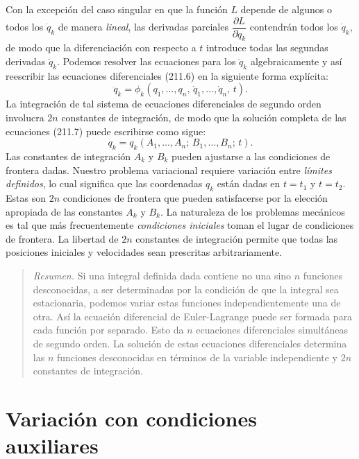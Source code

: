 \documentclass[12pt,a4paper]{book}
\begin{document}
Con la excepción del caso singular en que la función $L$ depende de algunos o todos los $\dot{q}_k$ de manera \textit{lineal}, las derivadas parciales $\dfrac{\partial L}{\partial \dot{q}_k}$ contendrán todos los $\dot{q}_k$, de modo que la diferenciación con respecto a $t$ introduce todas las segundas derivadas $\ddot{q}_k$. Podemos resolver las ecuaciones para los $\ddot{q}_k$ algebraicamente y así reescribir las ecuaciones diferenciales (211.6) en la siguiente forma explícita:
\begin{equation}
\ddot{q}_k = \phi_k(q_1, \ldots, q_n, \, \dot{q}_1, \ldots, \dot{q}_n, \, t). \tag{211.7}
\end{equation}
La integración de tal sistema de ecuaciones diferenciales de segundo orden involucra $2n$ constantes de integración, de modo que la solución completa de las ecuaciones (211.7) puede escribirse como sigue:
\begin{equation}
q_k = q_k(A_1, \ldots, A_n;\, B_1, \ldots, B_n;\, t). \tag{211.8}
\end{equation}
Las constantes de integración $A_k$ y $B_k$ pueden ajustarse a las condiciones de frontera dadas. Nuestro problema variacional requiere variación entre \textit{límites definidos}, lo cual significa que las coordenadas $q_k$ están dadas en $t = t_1$ y $t = t_2$. Estas son $2n$ condiciones de frontera que pueden satisfacerse por la elección apropiada de las constantes $A_k$ y $B_k$. La naturaleza de los problemas mecánicos es tal que más frecuentemente \textit{condiciones iniciales} toman el lugar de condiciones de frontera. La libertad de $2n$ constantes de integración permite que todas las posiciones iniciales y velocidades sean prescritas arbitrariamente.

\begin{quote}
\textit{Resumen.} Si una integral definida dada contiene no una sino $n$ funciones desconocidas, a ser determinadas por la condición de que la integral sea estacionaria, podemos variar estas funciones independientemente una de otra. Así la ecuación diferencial de Euler-Lagrange puede ser formada para cada función por separado. Esto da $n$ ecuaciones diferenciales simultáneas de segundo orden. La solución de estas ecuaciones diferenciales determina las $n$ funciones desconocidas en términos de la variable independiente y $2n$ constantes de integración.
\end{quote}

\section{Variación con condiciones auxiliares}
\end{document}
